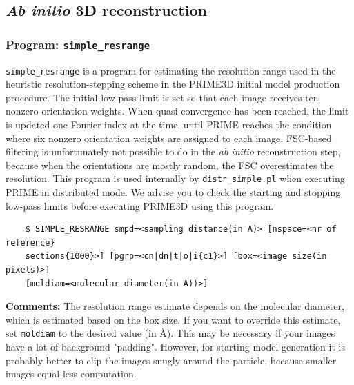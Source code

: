 \documentclass[a4paper,11pt]{article}
\newcommand{\prgname}[1]{\textcolor{NavyBlue}{\texttt{#1}}}
\begin{document}
\subsection{\textit{Ab initio} 3D reconstruction}

\subsubsection{Program: \prgname{simple\_resrange}}
\label{resrange}
\prgname{simple\_resrange} is a program for estimating the resolution range used in the heuristic resolution-stepping scheme in the PRIME3D initial model production procedure. The initial low-pass limit is set so that each image receives ten nonzero orientation weights. When quasi-convergence has been reached, the limit is updated one Fourier index at the time, until PRIME reaches the condition where six nonzero orientation weights are assigned to each image. FSC-based filtering is unfortunately not possible to do in the \textit{ab initio} reconstruction step, because when the orientations are mostly random, the FSC overestimates the resolution. This program is used internally by \prgname{distr\_simple.pl} when executing PRIME in distributed mode. We advise you to check the starting and stopping low-pass limits before executing PRIME3D using this program.
\begin{verbatim}
    $ SIMPLE_RESRANGE smpd=<sampling distance(in A)> [nspace=<nr of reference}
    sections{1000}>] [pgrp=<cn|dn|t|o|i{c1}>] [box=<image size(in pixels)>]
    [moldiam=<molecular diameter(in A))>]
\end{verbatim}
\noindent\textbf{Comments:} The resolution range estimate depends on the molecular diameter, which is estimated based on the box size. If you want to override this estimate, set \texttt{moldiam} to the desired value (in \AA{}). This may be necessary if your images have a lot of background "padding". However, for starting model generation it is probably better to clip the images snugly around the particle, because smaller images equal less computation.
\end{document}
